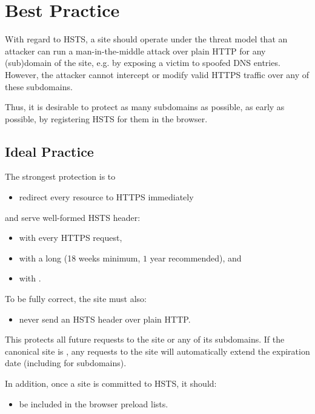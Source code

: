 \documentclass{acm_proc_article-sp}
\begin{document}
{\section{Best Practice}

With regard to HSTS, a site should operate under the threat model that an attacker can run a man-in-the-middle attack over plain HTTP for any (sub)domain of the site, e.g. by exposing a victim to spoofed DNS entries. However, the attacker cannot intercept or modify valid HTTPS traffic over any of these subdomains.

Thus, it is desirable to protect as many subdomains as possible, as early as possible, by registering HSTS for them in the browser.

\subsection{Ideal Practice}


The strongest protection is to

\begin{itemize}
\item redirect every resource to HTTPS immediately
\end{itemize}

and serve well-formed  HSTS header:

\begin{itemize}
\item with every HTTPS request,
\item with a long  (18 weeks minimum, $1$ year recommended), and
\item with {\iSD}.
\end{itemize}

To be fully correct, the site must also:

\begin{itemize}
\item never send an HSTS header over plain HTTP.
\end{itemize}

This protects all future requests to the site or any of its subdomains. If the canonical site is {\s}, any requests to the site will automatically extend the expiration date (including for subdomains).

In addition, once a site is committed to HSTS, it should:
\begin{itemize}
\item be included in the browser preload lists.
\end{itemize}

}
\end{document}
